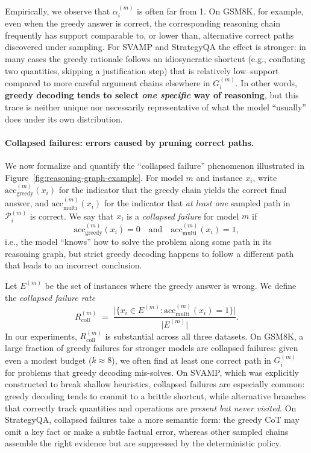 Empirically, we observe that $\alpha_i^{(m)}$ is often far from 1.
On GSM8K, for example, even when the greedy answer is correct, the
corresponding reasoning chain frequently has support comparable to, or
lower than, alternative correct paths discovered under sampling.
For SVAMP and StrategyQA the effect is stronger: in many cases the
greedy rationale follows an idiosyncratic shortcut (e.g., conflating
two quantities, skipping a justification step) that is relatively
low--support compared to more careful argument chains elsewhere in
$G_i^{(m)}$.
In other words, \textbf{greedy decoding tends to select
\emph{one specific} way of reasoning}, but this trace is neither unique
nor necessarily representative of what the model ``usually'' does under
its own distribution.

\paragraph{Collapsed failures: errors caused by pruning correct paths.}
We now formalize and quantify the ``collapsed failure'' phenomenon
illustrated in Figure~\ref{fig:reasoning-graph-example}.
For model $m$ and instance $x_i$, write
$\text{acc}_{\mathrm{greedy}}^{(m)}(x_i)$ for the indicator that the
greedy chain yields the correct final answer, and
$\text{acc}_{\mathrm{multi}}^{(m)}(x_i)$ for the indicator that
\emph{at least one} sampled path in $\mathcal{P}_i^{(m)}$ is correct.
We say that $x_i$ is a \emph{collapsed failure} for model $m$ if
\[
  \text{acc}_{\mathrm{greedy}}^{(m)}(x_i) = 0
  \quad\text{and}\quad
  \text{acc}_{\mathrm{multi}}^{(m)}(x_i) = 1,
\]
i.e., the model ``knows'' how to solve the problem along some path in
its reasoning graph, but strict greedy decoding happens to follow a
different path that leads to an incorrect conclusion.

Let $E^{(m)}$ be the set of instances where the greedy answer is wrong.
We define the \emph{collapsed failure rate}
\[
  R_{\mathrm{coll}}^{(m)}
  \;=\;
  \frac{\bigl|\{x_i \in E^{(m)} :
  \text{acc}_{\mathrm{multi}}^{(m)}(x_i) = 1\}\bigr|}
       {\bigl|E^{(m)}\bigr|}.
\]
In our experiments, $R_{\mathrm{coll}}^{(m)}$ is substantial across all
three datasets.
On GSM8K, a large fraction of greedy failures for stronger models are
collapsed failures: given even a modest budget ($k{\approx}8$), we
often find at least one correct path in $G_i^{(m)}$ for problems that
greedy decoding mis-solves.
On SVAMP, which was explicitly constructed to break shallow heuristics,
collapsed failures are especially common: greedy decoding tends to
commit to a brittle shortcut, while alternative branches that
correctly track quantities and operations are \emph{present but never
visited}.
On StrategyQA, collapsed failures take a more semantic form: the greedy
CoT may omit a key fact or make a subtle factual error, whereas other
sampled chains assemble the right evidence but are suppressed by the
deterministic policy.

